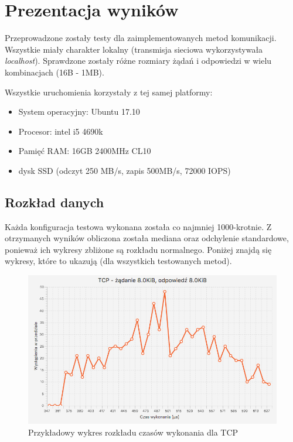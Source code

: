\chapter{Prezentacja wyników}

Przeprowadzone zostały testy dla zaimplementowanych metod komunikacji. Wszystkie miały charakter lokalny (transmisja sieciowa wykorzystywała \textit{localhost}). Sprawdzone zostały różne rozmiary żądań i odpowiedzi w wielu kombinacjach (16B - 1MB).

Wszystkie uruchomienia korzystały z tej samej platformy:
\begin{itemize}
    \item System operacyjny: Ubuntu 17.10
    \item Procesor: intel i5 4690k
    \item Pamięć RAM: 16GB 2400MHz CL10
    \item dysk SSD (odczyt 250 MB/s, zapis 500MB/s, 72000 IOPS)
\end{itemize}


\section{Rozkład danych}

Każda konfiguracja testowa wykonana została co najmniej 1000-krotnie. Z otrzymanych wyników obliczona została mediana oraz odchylenie standardowe, ponieważ ich wykresy zbliżone są rozkładu normalnego. Poniżej znajdą się wykresy, które to ukazują (dla wszystkich testowanych metod).


\begin{figure}[H]
    \centering
    \includegraphics[scale=0.38]{img/charts/TCP_chart_8192_8192.png}
    \caption{Przykładowy wykres rozkładu czasów wykonania dla TCP}
\end{figure}

